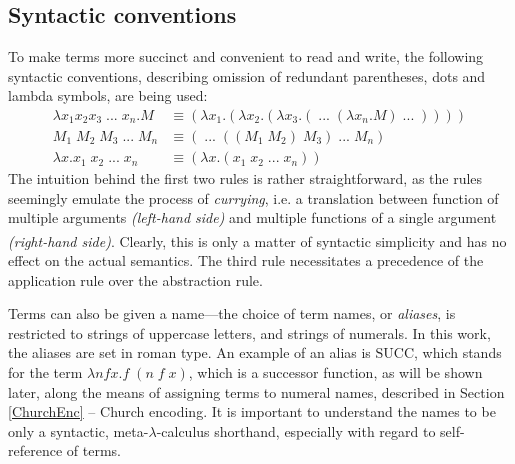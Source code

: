 \documentclass[table, a4paper, 10pt]{book}
\newcommand{\cit}[1]{\textsuperscript{\cite{#1}}}
\begin{document}
\subsection{Syntactic conventions} \label{sec:conventions}
To make terms more succinct and convenient to read and write, the 
following syntactic conventions, describing omission of redundant parentheses,
dots and lambda symbols, are being used:
\begin{align*}
	\lambda x_1 x_2 x_3\;...\;x_n.M &\equiv (\lambda x_1.(\lambda x_2.(\lambda x_3.(\;...\;(\lambda x_n.M)\;...\;))))\\
	M_1\;M_2\;M_3\;...\;M_n &\equiv (\;...\;((M_1\;M_2)\;M_3)\;...\;M_n)\\
	\lambda x.x_1\;x_2\;...\;x_n &\equiv (\lambda x.(x_1\;x_2\;...\;x_n))
\end{align*}
The intuition behind the first two rules is rather straightforward, as the rules
seemingly emulate the process of \textit{currying}, i.e.
a translation between function of multiple arguments \textit{(left-hand side)} and multiple
functions of a single argument \textit{(right-hand side)}.\cit{pierce} Clearly, this is only
a matter of syntactic simplicity and has no effect on the actual semantics.
The third rule necessitates a precedence of the application rule over the abstraction rule.

Terms can also be given a name---the choice of term names, or \textit{aliases}, is restricted to 
strings of uppercase letters, and strings of numerals. In this work, the aliases are set in roman type.
An example of an alias is $\mathrm{SUCC}$, which stands for the term $\lambda nfx.f\;(n\;f\;x)$,
which is a successor function, as will be shown later, along the means of
assigning terms to numeral names, described in Section \ref{ChurchEnc} -- Church encoding.
It is important to understand the names to be only a syntactic, meta-$\lambda$-calculus shorthand,
especially with regard to self-reference of terms.
\end{document}
